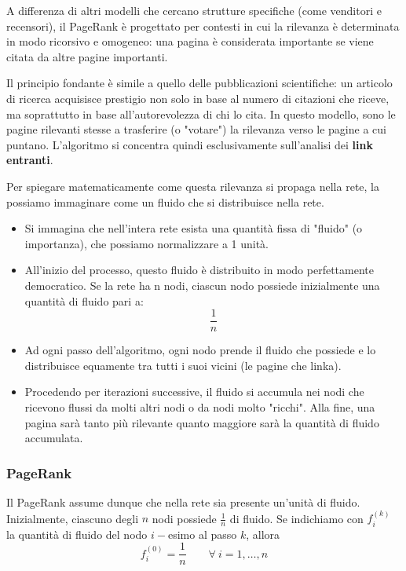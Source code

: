 A differenza di altri modelli che cercano strutture specifiche (come venditori e recensori), il PageRank è progettato per contesti in cui la rilevanza è determinata in modo ricorsivo e omogeneo: una pagina è considerata importante se viene citata da altre pagine importanti.

Il principio fondante è simile a quello delle pubblicazioni scientifiche: un articolo di ricerca acquisisce prestigio non solo in base al numero di citazioni che riceve, ma soprattutto in base all'autorevolezza di chi lo cita. In questo modello, sono le pagine rilevanti stesse a trasferire (o "votare") la rilevanza verso le pagine a cui puntano. L'algoritmo si concentra quindi esclusivamente sull'analisi dei \textbf{link entranti}.

Per spiegare matematicamente come questa rilevanza si propaga nella rete, la possiamo immaginare come un fluido che si distribuisce nella rete.

\begin{itemize}
    \item Si immagina che nell'intera rete esista una quantità fissa di "fluido" (o importanza), che possiamo normalizzare a 1 unità.
    \item All'inizio del processo, questo fluido è distribuito in modo perfettamente democratico. Se la rete ha n nodi, ciascun nodo possiede inizialmente una quantità di fluido pari a:
    \[
    \frac{1}{n}
    \]
    \item Ad ogni passo dell'algoritmo, ogni nodo prende il fluido che possiede e lo distribuisce equamente tra tutti i suoi vicini (le pagine che linka).
    \item Procedendo per iterazioni successive, il fluido si accumula nei nodi che ricevono flussi da molti altri nodi o da nodi molto "ricchi". Alla fine, una pagina sarà tanto più rilevante quanto maggiore sarà la quantità di fluido accumulata.
\end{itemize}

\subsubsection{PageRank}

Il PageRank assume dunque che nella rete sia presente un'unità di fluido. Inizialmente, ciascuno degli $n$ nodi possiede $\frac{1}{n}$ di fluido. Se indichiamo con $f_i^{(k)}$ la quantità di fluido del nodo $i-$esimo al passo $k$, allora
\[
f_i^{(0)} = \frac{1}{n} \qquad \forall\ i = 1, \dots, n
\]

